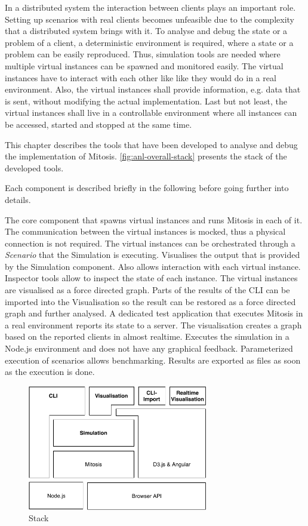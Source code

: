 In a distributed system the interaction between clients plays an important role. Setting up scenarios with real clients becomes unfeasible due to the complexity that a distributed system brings with it. To analyse and debug the state or a problem of a client, a deterministic environment is required, where a state or a problem can be easily reproduced.
Thus, simulation tools are needed where multiple virtual instances can be spawned and monitored easily. The virtual instances have to interact with each other like like they would do in a real environment. Also, the virtual instances shall provide information, e.g. data that is sent, without modifying the actual implementation. Last but not least, the virtual instances shall live in a controllable environment where all instances can be accessed, started and stopped at the same time. 

This chapter describes the tools that have been developed to analyse and debug the implementation of Mitosis. \vref{fig:anl-overall-stack} presents the stack of the developed tools.

Each component is described briefly in the following before going further into details.

\begin{itemize}
     The core component that spawns virtual instances and runs Mitosis in each of it. The communication between the virtual instances is mocked, thus a physical connection is not required. The virtual instances can be orchestrated through a \textit{Scenario} that the Simulation is executing.
     Visualises the output that is provided by the Simulation component. Also allows interaction with each virtual instance. Inspector tools allow to inspect the state of each instance. The virtual instances are visualised as a force directed graph.
     Parts of the results of the CLI can be imported into the Visualisation so the result can be restored as a force directed graph and further analysed.
     A dedicated test application that executes Mitosis in a real environment reports its state to a server. The visualisation creates a graph based on the reported clients in almost realtime. 
     Executes the simulation in a Node.js environment and does not have any graphical feedback. Parameterized execution of scenarios allows benchmarking. Results are exported as files as soon as the execution is done.
\end{itemize}

\begin{figure}
\centering
\includegraphics[width=0.7\textwidth]{graphics/analysis-tools/analysis-tools.pdf}
\caption{Stack}
\label{fig:anl-overall-stack}
\end{figure}